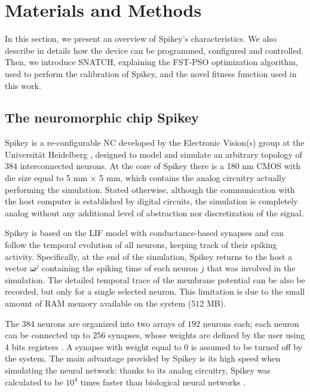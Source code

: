 \documentclass[utf8]{frontiersFPHY} %
\begin{document}
\section{Materials and Methods}
\label{sec:materials}
In this section, we present an overview of Spikey's characteristics. We also describe in details how the device can be programmed, configured and controlled. 
Then, we introduce SNATCH, explaining the FST-PSO optimization algorithm, used to perform the calibration of  Spikey, and the novel fitness function used in this work.

\subsection{The neuromorphic chip Spikey}
Spikey \citep{Pfeil2013}  is a re-configurable NC 
developed by the Electronic Vision(s) group at the Universit\"at Heidelberg \cite{Pfeil2013}, designed to model and simulate an arbitrary topology of 384 interconnected neurons.
At the core of Spikey there is a 180 nm CMOS with die size equal to 5 mm $\times$ 5 mm, which contains the analog circuitry actually performing the simulation. 
Stated otherwise, although the communication with the host computer is established by digital circuits, the simulation is completely analog without any additional level of abstraction nor discretization of the signal.




Spikey is based on the LIF model with conductance-based synapses \cite{Schemmel2007} and can follow the temporal evolution of all neurons, keeping track of their spiking activity.
Specifically, at the end of the simulation, Spikey  returns to the host a vector $\boldsymbol{\omega}^j$ containing the spiking time of each neuron $j$ that was involved in the simulation.
The detailed temporal trace of the membrane potential can be also be recorded, but only for a single selected neuron. 
This limitation is due to the small amount of RAM memory available on the system ($512$ MB).

The $384$ neurons are organized into two arrays of $192$ neurons each; each neuron can be connected up to $256$ synapses, whose weights are defined by the user using 4 bits registers \cite{Pfeil2012}. 
A synapse with weight equal to 0 is assumed to be turned off by the system. 
The main advantage provided by Spikey is its high speed when simulating the neural network: thanks to its analog circuitry, Spikey was calculated to be  $10^4$ times faster than biological neural networks \cite{Pfeil2013}. 
\end{document}

